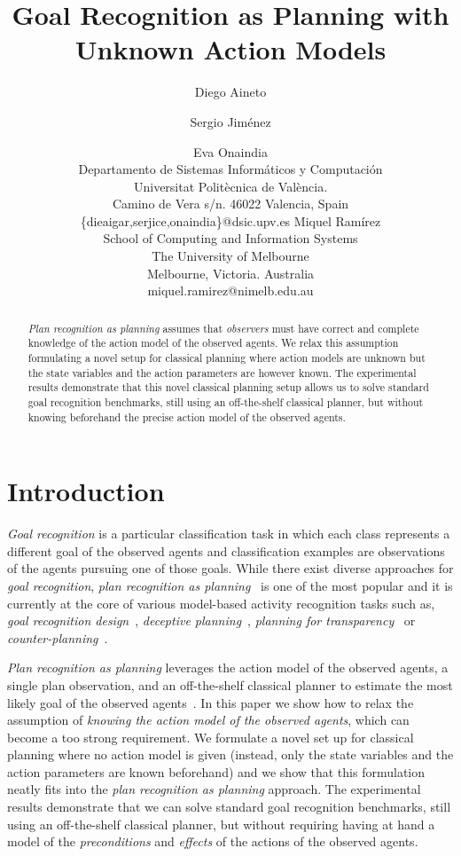\documentclass[letterpaper]{article} %
\title{Goal Recognition as Planning with Unknown Action Models}
\author{Diego Aineto \and Sergio Jim\'enez\and Eva Onaindia\\
{\scriptsize Departamento de Sistemas Inform\'aticos y Computaci\'on}\\
{\scriptsize Universitat Polit\`ecnica de Val\`encia.}\\
{\scriptsize Camino de Vera s/n. 46022 Valencia, Spain}\\
{\scriptsize \{dieaigar,serjice,onaindia\}@dsic.upv.es}
\And Miquel Ram\'irez\\
{\scriptsize School of Computing and Information Systems}\\
{\scriptsize The University of Melbourne}\\
{\scriptsize Melbourne, Victoria. Australia}\\
{\scriptsize miquel.ramirez@nimelb.edu.au}}
\begin{document}
\maketitle
\begin{abstract}
{\em Plan recognition as planning} assumes that {\em observers} must have correct and complete knowledge of the action model of the observed agents. We relax this assumption formulating a novel setup for classical planning where action models are unknown but the state variables and the action parameters are however known. The experimental results demonstrate that this novel classical planning setup allows us to solve standard goal recognition benchmarks, still using an off-the-shelf classical planner, but without knowing beforehand the precise action model of the observed agents. 
\end{abstract}



\section{Introduction}
\label{sec:introduction}
{\em Goal recognition} is a particular classification task in which each class represents a different goal of the observed agents and classification examples are observations of the agents pursuing one of those goals. While there exist diverse approaches for {\em goal recognition}, {\em plan recognition as planning}~\cite{ramirez2009plan,ramirez2010probabilistic} is one of the most popular and it is currently at the core of various model-based activity recognition tasks such as, {\em goal recognition design}~\cite{KerenGK14}, {\em deceptive planning}~\cite{masters2017deceptive}, {\em planning for transparency}~\cite{macnally2018action} or {\em counter-planning}~\cite{PozancoEFB18}.

{\em Plan recognition as planning} leverages the action model of the observed agents, a single plan observation, and an off-the-shelf classical planner to estimate the most likely goal of the observed agents~\cite{ramirez2012plan}. In this paper we show how to relax the assumption of {\em knowing the action model of the observed agents}, which can become a too strong requirement.  We formulate a novel set up for classical planning where no action model is given (instead, only the state variables and the action parameters are known beforehand) and we show that this formulation neatly fits into the {\em plan recognition as planning} approach. The experimental results demonstrate that we can solve standard goal recognition benchmarks, still using an off-the-shelf classical planner, but without requiring having at hand a model of the {\em preconditions} and {\em effects} of the actions of the observed agents.
\end{document}
